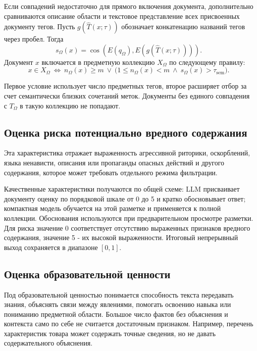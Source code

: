 \documentclass[12pt,a4paper]{article}
\begin{document}
Если совпадений недостаточно для прямого включения документа, дополнительно сравниваются
описание области и текстовое представление всех присвоенных документу тегов.
Пусть $g(\widehat T(x;\tau))$ обозначает конкатенацию названий тегов через пробел. 
Тогда
\begin{equation}
s_\Omega(x)=\cos\!\left(E(q_\Omega),E(g(\widehat T(x;\tau)))\right).
\end{equation}
Документ $x$ включается в предметную коллекцию $X_\Omega$ по следующему правилу:
\begin{equation} \label{include_in_corpora}
x\in X_\Omega\ \Longleftrightarrow\
n_\Omega(x)\geq m
\ \lor\
\bigl(1\leq n_\Omega(x)<m\ \land\ s_\Omega(x)>\tau_{\mathrm{sem}}\bigr).
\end{equation}

Первое условие использует число предметных тегов, второе расширяет отбор за счет семантически
близких сочетаний меток. Документы без единого совпадения с $T_\Omega$ в такую коллекцию не попадают.

\subsection{Оценка риска потенциально вредного содержания}

Эта характеристика отражает выраженность агрессивной риторики, оскорблений,
языка ненависти, описания или пропаганды опасных действий и другого содержания,
которое может требовать отдельного режима фильтрации.

Качественные характеристики получаются по общей схеме: LLM присваивает документу
оценку по порядковой шкале от 0 до 5 и кратко обосновывает ответ;
компактная модель обучается на этой разметке и применяется к полной коллекции.
Обоснования используются при предварительном просмотре разметки.
Для риска значение 0 соответствует отсутствию выраженных признаков вредного содержания,
значение 5 - их высокой выраженности. Итоговый непрерывный выход сохраняется в диапазоне $[0,1]$.

\subsection{Оценка образовательной ценности}

Под образовательной ценностью понимается способность текста передавать знания,
объяснять связи между явлениями, помогать освоению навыка или пониманию предметной области.
Большое число фактов без объяснения и контекста само по себе не считается достаточным признаком.
Например, перечень характеристик товара может содержать точные сведения,
но не давать содержательного объяснения.
\end{document}
